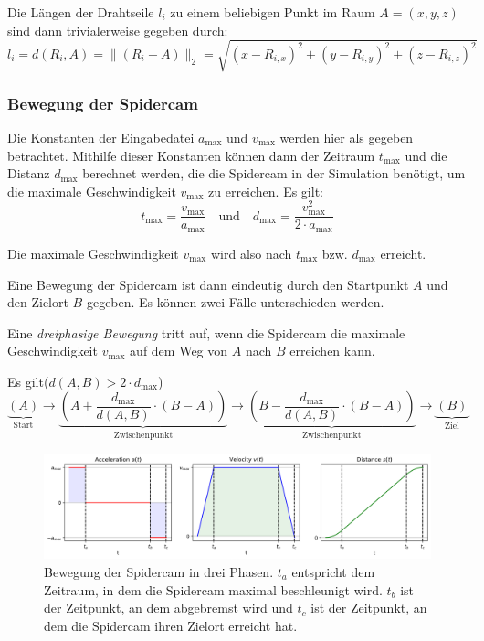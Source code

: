 Die Längen der Drahtseile $l_i$ zu einem beliebigen Punkt im Raum $A = (x, y, z)$ sind dann trivialerweise gegeben durch:
\[
    l_i = d(R_i, A) = \| (R_i - A) \|_2 =
    \sqrt{
        (x - R_{i, x})^2 + (y - R_{i, y})^2 + (z - R_{i, z})^2
    }
\]

\subsubsection{Bewegung der Spidercam}
\label{sssec:bewegung_der_spidercam}

Die Konstanten der Eingabedatei $a_{\max}$ und $v_{\max}$ werden hier als gegeben betrachtet.
Mithilfe dieser Konstanten können dann der Zeitraum $t_{\max}$ und die Distanz $d_{\max}$ berechnet werden, die die Spidercam in der Simulation benötigt, um die maximale Geschwindigkeit $v_{\max}$ zu erreichen.
Es gilt:
\[
    t_{\max} = \frac{v_{\max}}{a_{\max}} \quad \text{und} \quad d_{\max} = \frac{v_{\max}^2}{2 \cdot a_{\max}}
\]

Die maximale Geschwindigkeit $v_{\max}$ wird also nach $t_{\max}$ bzw. $d_{\max}$ erreicht.

Eine Bewegung der Spidercam ist dann eindeutig durch den Startpunkt $A$ und den Zielort $B$ gegeben.
Es können zwei Fälle unterschieden werden.

Eine \emph{dreiphasige Bewegung} tritt auf, wenn die Spidercam die maximale Geschwindigkeit $v_{\max}$ auf dem Weg von $A$ nach $B$ erreichen kann.

Es gilt($d(A, B) > 2 \cdot d_{\max}$)
\[
    \underbrace{(A)}_{\text{Start}} \rightarrow \underbrace{\left(A + \frac{d_{\max}}{d(A, B)} \cdot (B - A)\right)}_{\text{Zwischenpunkt}} \rightarrow \underbrace{\left(B - \frac{d_{\max}}{d(A, B)} \cdot (B - A)\right)}_{\text{Zwischenpunkt}} \rightarrow \underbrace{(B)}_{\text{Ziel}}
\]

\begin{figure}[H]
    \centering
    \includegraphics[width=\textwidth]{figures/three_phases.png}
    \caption{Bewegung der Spidercam in drei Phasen. $t_a$ entspricht dem Zeitraum, in dem die Spidercam maximal beschleunigt wird. $t_b$ ist der Zeitpunkt, an dem abgebremst wird und $t_c$ ist der Zeitpunkt, an dem die Spidercam ihren Zielort erreicht hat.}
    \label{fig:three_phases}
\end{figure}

